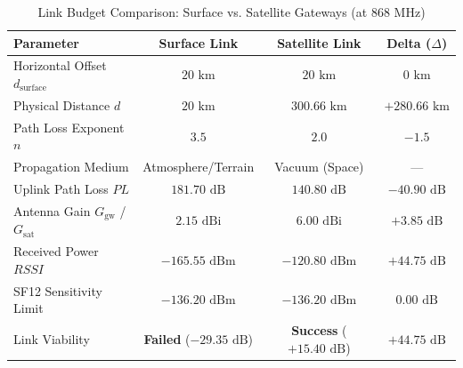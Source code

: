 \documentclass[journal,10pt,doublecolumn]{IEEEtran}
\begin{document}
\begin{table}[t]
\centering
\caption{Link Budget Comparison: Surface vs. Satellite Gateways (at $868$ MHz)}
\label{tab:link_budget_comparison}
\begin{tabular}{lccc}
\toprule
\textbf{Parameter} & \textbf{Surface Link} & \textbf{Satellite Link} & \textbf{Delta ($\Delta$)} \\
\midrule
Horizontal Offset $d_{\text{surface}}$ & $20\text{ km}$ & $20\text{ km}$ & $0\text{ km}$ \\
Physical Distance $d$ & $20\text{ km}$ & $300.66\text{ km}$ & $+280.66\text{ km}$ \\
Path Loss Exponent $n$ & $3.5$ & $2.0$ & $-1.5$ \\
Propagation Medium & Atmosphere/Terrain & Vacuum (Space) & — \\
Uplink Path Loss $PL$ & $181.70\text{ dB}$ & $140.80\text{ dB}$ & $-40.90\text{ dB}$ \\
Antenna Gain $G_{\text{gw}}$ / $G_{\text{sat}}$ & $2.15\text{ dBi}$ & $6.00\text{ dBi}$ & $+3.85\text{ dB}$ \\
Received Power $RSSI$ & $-165.55\text{ dBm}$ & $-120.80\text{ dBm}$ & $+44.75\text{ dB}$ \\
SF12 Sensitivity Limit & $-136.20\text{ dBm}$ & $-136.20\text{ dBm}$ & $0.00\text{ dB}$ \\
Link Viability & \textbf{Failed} ($-29.35\text{ dB}$) & \textbf{Success} ($+15.40\text{ dB}$) & $+44.75\text{ dB}$ \\
\bottomrule
\end{tabular}
\end{table}
\end{document}
